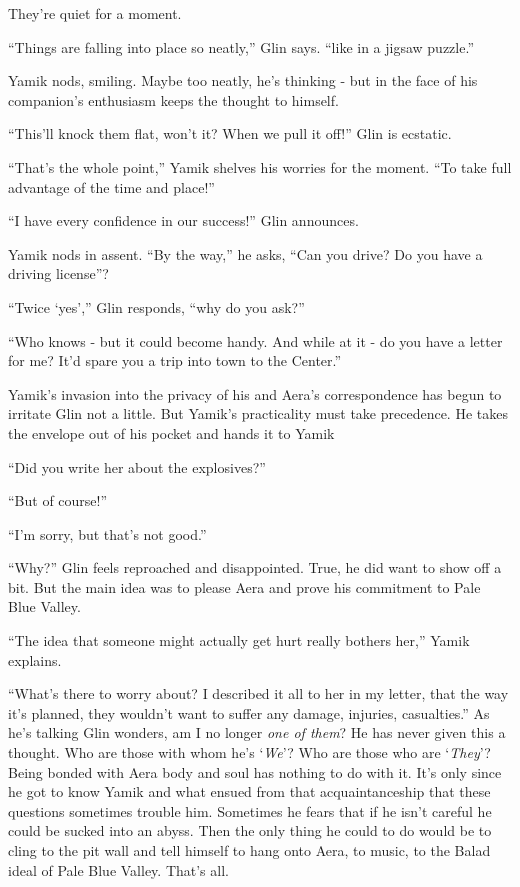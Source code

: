 \documentclass[twoside,11pt]{book}
\begin{document}
They're quiet for a moment.

``Things are falling into place so neatly,'' Glin says. ``like in a jigsaw
puzzle.''

Yamik nods, smiling. Maybe too neatly, he's thinking - but in the face of his companion's enthusiasm keeps the thought
to himself.

``This'll knock them flat, won't it? When we pull it off!'' Glin is ecstatic.

``That's the whole point,'' Yamik shelves his worries for the moment. ``To take
full advantage of the time and place!''

``I have every confidence in our success!'' Glin announces.

Yamik nods in assent. ``By the way,'' he asks, ``Can you drive? Do you have a
driving license''?

``Twice `yes','' Glin responds, ``why do you ask?''

``Who knows - but it could become handy. And while at it - do you have a letter for me? It'd spare you a
trip into town to the Center.''

Yamik's invasion into the privacy of his and Aera's correspondence has begun to irritate Glin not a little. But Yamik's
practicality must take precedence. He takes the envelope out of his pocket and hands it to Yamik

``Did you write her about the explosives?''

``But of course!''

``I'm sorry, but that's not good.''

``Why?'' Glin feels reproached and disappointed. True, he did want to show off a bit. But the
main idea was to please Aera and prove his commitment to Pale Blue Valley.

``The idea that someone might actually get hurt really bothers her,'' Yamik explains.

``What's there to worry about? I described it all to her in my letter, that the way it's planned, they
 wouldn't want to suffer any damage, injuries, casualties.'' As he's talking Glin wonders, am I no
longer \textit{one of them}? He has never given this a thought. Who are those
with whom he's `\textit{We}'? Who are those who are `\textit{They}'? Being bonded with Aera body and soul has
nothing to do with it. It's only since he got to know Yamik and what ensued from that acquaintanceship that these
questions sometimes trouble him. Sometimes he fears that if he isn't careful he could be sucked into an abyss. Then
the only thing he could to do would be to cling to the pit wall and tell himself to hang onto Aera, to music, to the
Balad ideal of Pale Blue Valley. That's all.
\end{document}
